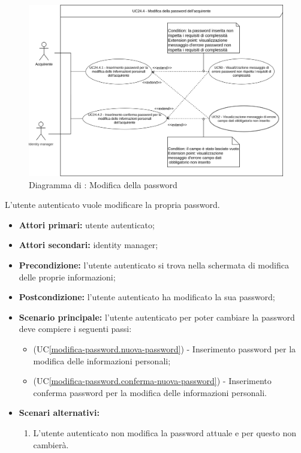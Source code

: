 \label{modifica-password}

\begin{figure}[H]
    \centering
    \includegraphics[scale=0.6]{Immagini/DiagrammiUC/UtenteAutenticato/ModificaPassword.png}
    \caption{Diagramma di \actualUC: Modifica della password}
    \label{fig:modifica-password}
\end{figure}

L'utente autenticato vuole modificare la propria password.

\begin{itemize}
    \item \textbf{Attori primari:} utente autenticato;
    \item \textbf{Attori secondari:} identity manager;
    \item \textbf{Precondizione:} l'utente autenticato si trova nella schermata di modifica delle proprie informazioni;
    \item \textbf{Postcondizione:} l'utente autenticato ha modificato la sua password;
    \item \textbf{Scenario principale:} l'utente autenticato per poter cambiare la password deve compiere i seguenti passi:
    \begin{itemize}
        \item (UC\ref{modifica-password.nuova-password}) - Inserimento password per la modifica delle informazioni personali;
        \item (UC\ref{modifica-password.conferma-nuova-password}) - Inserimento conferma password per la modifica delle informazioni personali.
    \end{itemize}
    \item \textbf{Scenari alternativi:}
    \begin{enumerate}[label=\lett]
        \item L'utente autenticato non modifica la password attuale e per questo non cambierà. 
    \end{enumerate}
\end{itemize}

